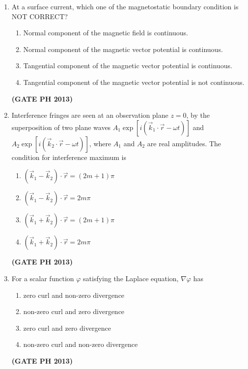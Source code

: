 \documentclass[14pt, a4paper]{extarticle}
\renewcommand{\vec}[1]{\overrightarrow{#1}}
\begin{document}
\begin{enumerate}[label=\textbf{Q. \arabic*}]
\item At a surface current, which one of the magnetostatic boundary condition is NOT CORRECT?
\begin{enumerate}
    \item Normal component of the magnetic field is continuous.
    \item Normal component of the magnetic vector potential is continuous.
    \item Tangential component of the magnetic vector potential is continuous.
    \item Tangential component of the magnetic vector potential is not continuous.
\end{enumerate}
\hfill \textbf{(GATE PH 2013)}

\item Interference fringes are seen at an observation plane $z = 0$, by the superposition of two plane waves $A_1\exp[i(\vec{k}_1 \cdot \vec{r} - \omega t)]$ and $A_2\exp[i(\vec{k}_2 \cdot \vec{r} - \omega t)]$, where $A_1$ and $A_2$ are real amplitudes. The condition for interference maximum is
\begin{enumerate}
    \item $(\vec{k}_1 - \vec{k}_2) \cdot \vec{r} = (2m+1)\pi$
    \item $(\vec{k}_1 - \vec{k}_2) \cdot \vec{r} = 2m\pi$
    \item $(\vec{k}_1 + \vec{k}_2) \cdot \vec{r} = (2m+1)\pi$
    \item $(\vec{k}_1 + \vec{k}_2) \cdot \vec{r} = 2m\pi$
\end{enumerate}
\hfill \textbf{(GATE PH 2013)}

\item For a scalar function $\varphi$ satisfying the Laplace equation, $\nabla\varphi$ has
\begin{enumerate}
    \item zero curl and non-zero divergence
    \item non-zero curl and zero divergence
    \item zero curl and zero divergence
    \item non-zero curl and non-zero divergence
\end{enumerate}
\hfill \textbf{(GATE PH 2013)}


\end{enumerate}
\end{document}
